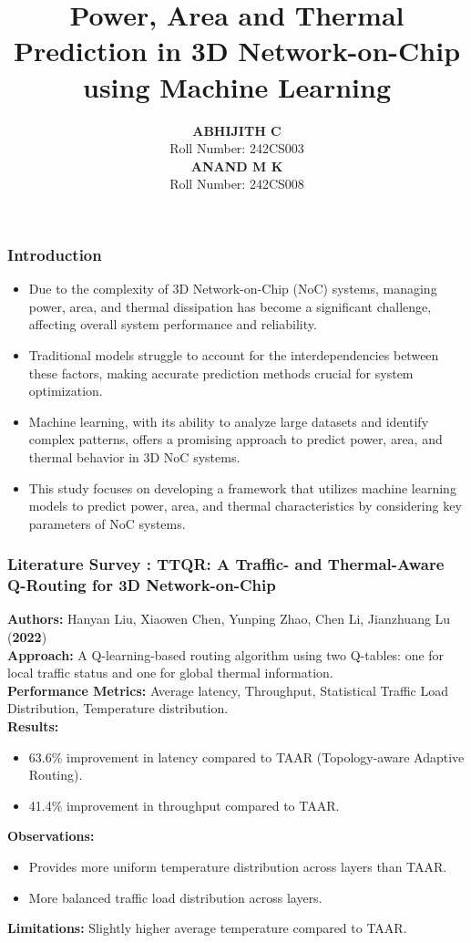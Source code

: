 \documentclass{beamer}
\title{Power, Area and Thermal Prediction in 3D Network-on-Chip using Machine Learning}
\author{
	\textbf{ABHIJITH C} \\ %
	Roll Number: 242CS003 \\ %
	\textbf{ANAND M K} \\ %
	Roll Number: 242CS008 %
}
\institute{
	Department of Computer Science and Engineering \\ 
	National Institute of Technology Karnataka (NITK) \\ 
	Surathkal, India
}
\date{} %
\begin{document}
	
	\frame{\titlepage}
	
	\begin{frame}
		\frametitle{Introduction}
		\begin{itemize}
			\item Due to the complexity of 3D Network-on-Chip (NoC) systems, managing power, area, and thermal dissipation has become a significant challenge, affecting overall system performance and reliability.
			\item Traditional models struggle to account for the interdependencies between these factors, making accurate prediction methods crucial for system optimization.
			\item Machine learning, with its ability to analyze large datasets and identify complex patterns, offers a promising approach to predict power, area, and thermal behavior in 3D NoC systems.
			\item This study focuses on developing a framework that utilizes machine learning models to predict power, area, and thermal characteristics by considering key parameters of NoC systems.
		\end{itemize}
\end{frame}

\begin{frame}[fragile]
\frametitle{Literature Survey : TTQR: A Traffic- and Thermal-Aware Q-Routing for 3D Network-on-Chip}

\textbf{Authors:} Hanyan Liu, Xiaowen Chen, Yunping Zhao, Chen Li, Jianzhuang Lu (\textbf{2022}) \\
\textbf{Approach:} A Q-learning-based routing algorithm using two Q-tables: one for local traffic status and one for global thermal information. \\
\textbf{Performance Metrics:} Average latency, Throughput, Statistical Traffic Load Distribution, Temperature distribution. \\
\textbf{Results:} 
\begin{itemize}
    \item 63.6\% improvement in latency compared to TAAR (Topology-aware Adaptive Routing).
    \item 41.4\% improvement in throughput compared to TAAR.
\end{itemize}
\textbf{Observations:} 
\begin{itemize}
    \item Provides more uniform temperature distribution across layers than TAAR.
    \item More balanced traffic load distribution across layers.
\end{itemize}
\textbf{Limitations:} Slightly higher average temperature compared to TAAR.
\end{frame}
\end{document}
